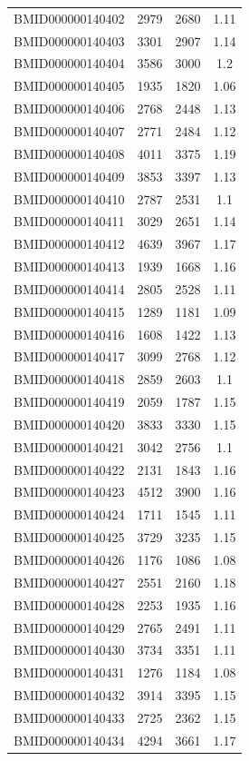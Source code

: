 \documentclass{bmcart}
\begin{document}
\begin{backmatter}
\begin{center}
\begin{longtable}{c|c|c|c}
BMID000000140402 & 2979 & 2680 & 1.11 \\
BMID000000140403 & 3301 & 2907 & 1.14 \\
BMID000000140404 & 3586 & 3000 & 1.2 \\
BMID000000140405 & 1935 & 1820 & 1.06 \\
BMID000000140406 & 2768 & 2448 & 1.13 \\
BMID000000140407 & 2771 & 2484 & 1.12 \\
BMID000000140408 & 4011 & 3375 & 1.19 \\
BMID000000140409 & 3853 & 3397 & 1.13 \\
BMID000000140410 & 2787 & 2531 & 1.1 \\
BMID000000140411 & 3029 & 2651 & 1.14 \\
BMID000000140412 & 4639 & 3967 & 1.17 \\
BMID000000140413 & 1939 & 1668 & 1.16 \\
BMID000000140414 & 2805 & 2528 & 1.11 \\
BMID000000140415 & 1289 & 1181 & 1.09 \\
BMID000000140416 & 1608 & 1422 & 1.13 \\
BMID000000140417 & 3099 & 2768 & 1.12 \\
BMID000000140418 & 2859 & 2603 & 1.1 \\
BMID000000140419 & 2059 & 1787 & 1.15 \\
BMID000000140420 & 3833 & 3330 & 1.15 \\
BMID000000140421 & 3042 & 2756 & 1.1 \\
BMID000000140422 & 2131 & 1843 & 1.16 \\
BMID000000140423 & 4512 & 3900 & 1.16 \\
BMID000000140424 & 1711 & 1545 & 1.11 \\
BMID000000140425 & 3729 & 3235 & 1.15 \\
BMID000000140426 & 1176 & 1086 & 1.08 \\
BMID000000140427 & 2551 & 2160 & 1.18 \\
BMID000000140428 & 2253 & 1935 & 1.16 \\
BMID000000140429 & 2765 & 2491 & 1.11 \\
BMID000000140430 & 3734 & 3351 & 1.11 \\
BMID000000140431 & 1276 & 1184 & 1.08 \\
BMID000000140432 & 3914 & 3395 & 1.15 \\
BMID000000140433 & 2725 & 2362 & 1.15 \\
BMID000000140434 & 4294 & 3661 & 1.17 \\

\end{longtable}
\end{center}
\end{backmatter}
\end{document}
